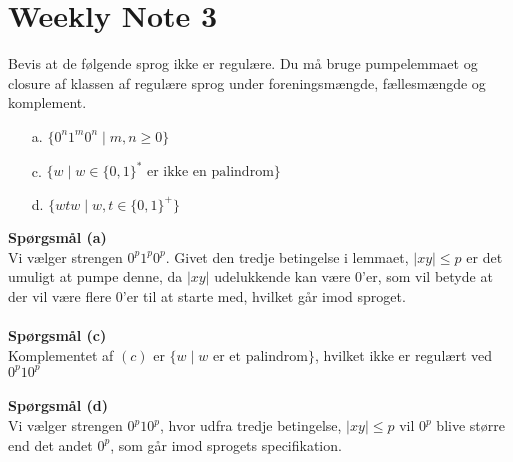 \chapter{Weekly Note 3}

\begin{exercise}[Sipser 1.46 (a) (c) (d)]
  Bevis at de følgende sprog ikke er regulære. Du må bruge pumpelemmaet og closure af klassen af regulære sprog under foreningsmængde, fællesmængde og komplement.

  \begin{enumerate}
    \item[a.] $\{0^{n}1^{m}0^{n} \mid m,n \ge 0\}$
    \item[c.] $\{w \mid w \in \{0,1\}^{*} \text{ er ikke en palindrom}\}$
    \item[d.] $\{wtw \mid w, t \in \{0,1\}^{+}\}$
  \end{enumerate}
\end{exercise}

\noindent
\textbf{Spørgsmål (a)}\\
\noindent
Vi vælger strengen $0^{p}1^{p}0^{p}$. Givet den tredje betingelse i lemmaet, $|xy| \le p$ er det umuligt at pumpe denne, da $|xy|$ udelukkende kan være $0$'er, som vil betyde at der vil være flere 0'er til at starte med, hvilket går imod sproget.\\\\
\noindent
\textbf{Spørgsmål (c)}\\
\noindent
Komplementet af $(c)$ er $\{w \mid w \text{ er et palindrom}\}$, hvilket ikke er regulært ved $0^{p}10^{p}$\\\\
\noindent
\textbf{Spørgsmål (d)}\\
\noindent
Vi vælger strengen $0^{p}10^{p}$, hvor udfra tredje betingelse, $|xy| \le p$ vil $0^{p}$ blive større end det andet $0^{p}$, som går imod sprogets specifikation.\\\\

